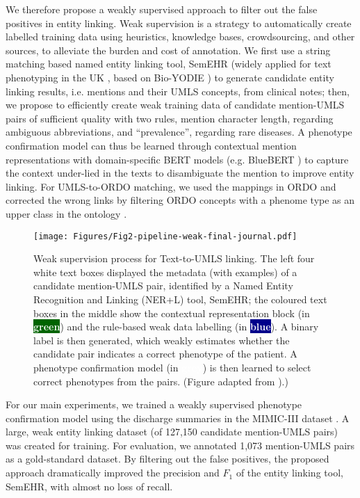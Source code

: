\documentclass[twocolumn]{bmcart}
\begin{document}
We therefore propose a weakly supervised approach to filter out the false positives in entity linking. Weak supervision \cite{wang_clinical_2019,ratner2019} is a strategy to automatically create labelled training data using heuristics, knowledge bases, crowdsourcing, and other sources, to alleviate the burden and cost of annotation. We first use a string matching based named entity linking tool, SemEHR \cite{Wu2018semehr} (widely applied for text phenotyping in the UK \cite{Wu2018semehr,wu2019,gorinski_named_2019}, based on Bio-YODIE \cite{gorrell2018}) to generate candidate entity linking results, i.e. mentions and their UMLS concepts, from clinical notes; then, we propose to efficiently create weak training data of candidate mention-UMLS pairs of sufficient quality with two rules, mention character length, regarding ambiguous abbreviations, and ``prevalence'', regarding rare diseases. A phenotype confirmation model can thus be learned through contextual mention representations with domain-specific BERT models (e.g. BlueBERT \cite{peng2019transfer}) to capture the context under-lied in the texts to disambiguate the mention to improve entity linking. For UMLS-to-ORDO matching, we used the mappings in ORDO and corrected the wrong links by filtering ORDO concepts with a phenome type as an upper class in the ontology \cite{vasant2014ordo}. 

\begin{figure*}[ht]
  \centering
  \texttt{[image: Figures/Fig2-pipeline-weak-final-journal.pdf]}
  \caption{Weak supervision process for Text-to-UMLS linking. The left four white text boxes displayed the metadata (with examples) of a candidate mention-UMLS pair, identified by a Named Entity Recognition and Linking (NER+L) tool, SemEHR; the coloured text boxes in the middle show the contextual representation block (in \colorbox{darkgreen}{\textcolor{white}{\textbf{green}}}) and the rule-based weak data labelling (in \colorbox{darkblue}{\textcolor{white}{\textbf{blue}}}). A binary label is then generated, which weakly estimates whether the candidate pair indicates a correct phenotype of the patient. A phenotype confirmation model (in \colorbox{mediumgrey}{\textcolor{white}{\textbf{grey}}}) is then learned to select correct phenotypes from the pairs. (Figure adapted from \cite{dong2021rare}).)}\label{pipeline-weak}
\end{figure*}

For our main experiments, we trained a weakly supervised phenotype confirmation model using the discharge summaries in the MIMIC-III dataset \cite{johnson_mimic-iii_2016}. A large, weak entity linking dataset (of 127,150 candidate mention-UMLS pairs) was created for training. For evaluation, we annotated 1,073 mention-UMLS pairs as a gold-standard dataset. By filtering out the false positives, the proposed approach dramatically improved the precision and $F_1$ of the entity linking tool, SemEHR, with almost no loss of recall.
\end{document}
